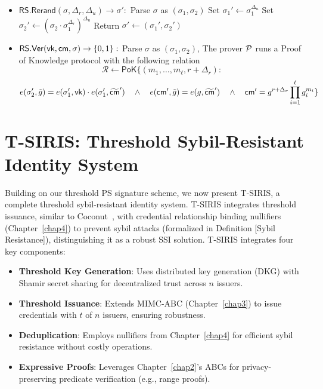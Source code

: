 \begin{itemize}
    \item $\mathsf{RS.Rerand}(\sigma, \Delta_r, \Delta_u) \to \sigma':$
        Parse $\sigma$ as $(\sigma_1, \sigma_2)$
        Set $\sigma_1' \gets \sigma_1^{\Delta_u}$
        Set $\sigma_2' \gets (\sigma_2 \cdot \sigma_1^{\Delta_r})^{\Delta_u}$
        Return $\sigma' \gets (\sigma_1', \sigma_2')$
    
    \item $\mathsf{RS.Ver}(\mathsf{vk}, \mathsf{cm}, \sigma) \to \{0,1\}:$
        Parse $\sigma$ as $(\sigma_1, \sigma_2)$, The prover $\mathcal{P}$ runs a Proof of Knowledge protocol with the following relation 
    \[
        \mathcal{R} \gets \mathsf{PoK}\{(m_1,\ldots,m_\ell, r + \Delta_r): 
    \]
    \[
         e(\sigma_2', \tilde{g}) = e(\sigma_1', \mathsf{vk})\cdot e(\sigma_1', \widetilde{\mathsf{cm}}') \quad \wedge \quad
        e(\mathsf{cm}', \tilde{g}) = e(g, \widetilde{\mathsf{cm}}') \quad \wedge \quad
        \mathsf{cm}' = g^{r + \Delta_r} \prod_{i=1}^\ell g_i^{m_i}
        \}
    \]

\end{itemize}





\section{T-SIRIS: Threshold Sybil-Resistant Identity System}\label{chap5:sec_tsiris}
\label{sec:tsiris}
Building on our threshold PS signature scheme, we now present T-SIRIS, a complete threshold sybil-resistant identity system. T-SIRIS integrates threshold issuance, similar to Coconut~\cite{sonnino_coconut_2020}, with credential relationship binding nullifiers (Chapter~\ref{chap4}) to prevent sybil attacks (formalized in Definition [Sybil Resistance]), distinguishing it as a robust SSI solution. T-SIRIS integrates four key components:
\begin{itemize}
    \item \textbf{Threshold Key Generation}: Uses distributed key generation (DKG) with Shamir secret sharing for decentralized trust across $n$ issuers.
    \item \textbf{Threshold Issuance}: Extends MIMC-ABC (Chapter~\ref{chap3}) to issue credentials with $t$ of $n$ issuers, ensuring robustness.
    \item \textbf{Deduplication}: Employs nullifiers from Chapter~\ref{chap4} for efficient sybil resistance without costly operations.
    \item \textbf{Expressive Proofs}: Leverages Chapter~\ref{chap2}'s ABCs for privacy-preserving predicate verification (e.g., range proofs).
\end{itemize}


